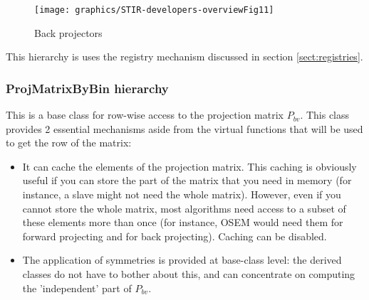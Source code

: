 \documentclass{article}
\begin{document}
\begin{figure}[htbp]
\begin{center}
\texttt{[image: graphics/STIR-developers-overviewFig11]}
\caption{Back projectors}
\end{center}
\end{figure}

This hierarchy is uses the registry mechanism discussed in section 
\ref{sect:registries}.

\subsubsection{
ProjMatrixByBin hierarchy}

This is a base class for row-wise access to the projection matrix $P_{bv}$. 
This class provides 2 essential mechanisms aside from the virtual 
functions that will be used to get the row of the matrix:
\begin{itemize}
\item 
It can cache the elements of the projection matrix. This caching 
is obviously useful if you can store the part of the matrix that 
you need in memory (for instance, a slave might not need the 
whole matrix). However, even if you cannot store the whole matrix, 
most algorithms need access to a subset of these elements more 
than once (for instance, OSEM would need them for forward projecting 
and for back projecting). Caching can be disabled.
\item 
The application of symmetries is provided at base-class level: 
the derived classes do not have to bother about this, and can 
concentrate on computing the 'independent' part of $P_{bv}$. 
\end{itemize}
\end{document}
